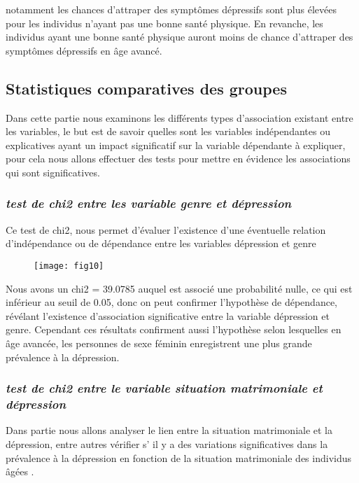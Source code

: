 \documentclass[a4paper]{article}
\begin{document}
notamment les  chances d’attraper des symptômes dépressifs sont plus élevées pour les individus n’ayant pas une bonne santé physique. En revanche, les individus ayant une bonne santé physique auront moins de chance d’attraper des symptômes dépressifs en âge avancé. 
 
 
 
\subsection{Statistiques comparatives des groupes}  
 
Dans cette partie nous examinons les différents types d’association existant entre les variables, le but est de savoir quelles sont les variables indépendantes ou explicatives ayant un impact significatif sur la variable dépendante à expliquer, pour cela nous allons effectuer des tests pour mettre en évidence les associations qui sont significatives.
   
\subsubsection{\textit{test de chi2 entre les variable genre et dépression}}

Ce test de chi2, nous permet d'évaluer l'existence d’une éventuelle relation d'indépendance ou de dépendance entre les variables dépression et genre

\begin{figure}[h!]
	\centering
	\texttt{[image: fig10]}
	\caption{}
	\label{fig:fig10}
\end{figure}

Nous avons un chi2 = 39.0785 auquel est associé une probabilité nulle, ce qui est inférieur au seuil de 0.05, donc on peut confirmer l'hypothèse de dépendance, révélant  l'existence d’association significative entre la variable dépression et genre. Cependant ces résultats confirment aussi  l'hypothèse selon lesquelles en âge avancée, les personnes de sexe féminin enregistrent une plus grande prévalence à la dépression.

\subsubsection{\textit{test de chi2 entre le variable situation matrimoniale et dépression}}

Dans partie nous allons analyser le lien entre la situation matrimoniale et la dépression, entre autres vérifier s' il y a des variations significatives dans la prévalence à la dépression en fonction de la situation matrimoniale des individus âgées .
\end{document}
